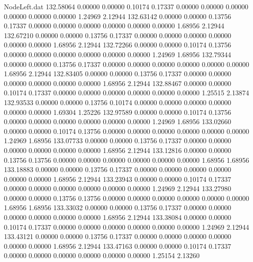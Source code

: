 \begin{filecontents}{NodeLeft.dat}
 132.58064    0.00000    0.00000     0.10174    0.17337    0.00000    0.00000    0.00000    0.00000    0.00000    0.00000    1.24969    2.12944
 132.63142    0.00000    0.00000     0.13756    0.17337    0.00000    0.00000    0.00000    0.00000    0.00000    0.00000    1.68956    2.12944
 132.67210    0.00000    0.00000     0.13756    0.17337    0.00000    0.00000    0.00000    0.00000    0.00000    0.00000    1.68956    2.12944
 132.72266    0.00000    0.00000     0.10174    0.13756    0.00000    0.00000    0.00000    0.00000    0.00000    0.00000    1.24969    1.68956
 132.79344    0.00000    0.00000     0.13756    0.17337    0.00000    0.00000    0.00000    0.00000    0.00000    0.00000    1.68956    2.12944
 132.83405    0.00000    0.00000     0.13756    0.17337    0.00000    0.00000    0.00000    0.00000    0.00000    0.00000    1.68956    2.12944
 132.88467    0.00000    0.00000     0.10174    0.17337    0.00000    0.00000    0.00000    0.00000    0.00000    0.00000    1.25515    2.13874
 132.93533    0.00000    0.00000     0.13756    0.10174    0.00000    0.00000    0.00000    0.00000    0.00000    0.00000    1.69304    1.25226
 132.97589    0.00000    0.00000     0.10174    0.13756    0.00000    0.00000    0.00000    0.00000    0.00000    0.00000    1.24969    1.68956
 133.02660    0.00000    0.00000     0.10174    0.13756    0.00000    0.00000    0.00000    0.00000    0.00000    0.00000    1.24969    1.68956
 133.07733    0.00000    0.00000     0.13756    0.17337    0.00000    0.00000    0.00000    0.00000    0.00000    0.00000    1.68956    2.12944
 133.12816    0.00000    0.00000     0.13756    0.13756    0.00000    0.00000    0.00000    0.00000    0.00000    0.00000    1.68956    1.68956
 133.18883    0.00000    0.00000     0.13756    0.17337    0.00000    0.00000    0.00000    0.00000    0.00000    0.00000    1.68956    2.12944
 133.23943    0.00000    0.00000     0.10174    0.17337    0.00000    0.00000    0.00000    0.00000    0.00000    0.00000    1.24969    2.12944
 133.27980    0.00000    0.00000     0.13756    0.13756    0.00000    0.00000    0.00000    0.00000    0.00000    0.00000    1.68956    1.68956
 133.33032    0.00000    0.00000     0.13756    0.17337    0.00000    0.00000    0.00000    0.00000    0.00000    0.00000    1.68956    2.12944
 133.38084    0.00000    0.00000     0.10174    0.17337    0.00000    0.00000    0.00000    0.00000    0.00000    0.00000    1.24969    2.12944
 133.43121    0.00000    0.00000     0.13756    0.17337    0.00000    0.00000    0.00000    0.00000    0.00000    0.00000    1.68956    2.12944
 133.47163    0.00000    0.00000     0.10174    0.17337    0.00000    0.00000    0.00000    0.00000    0.00000    0.00000    1.25154    2.13260

\end{filecontents}
